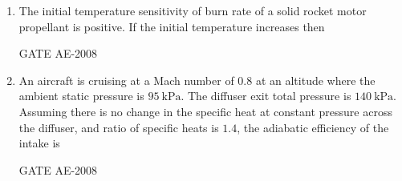 \documentclass[journal,12pt,onecolumn]{IEEEtran}
\theoremstyle{remark}
\begin{document}
\begin{enumerate}
\item The initial temperature sensitivity of burn rate of a solid rocket motor propellant is positive. If the initial temperature increases then  \\
\begin{enumerate}
\end{enumerate}
\hfill{GATE AE-2008}

    \quad

\item An aircraft is cruising at a Mach number of $0.8$ at an altitude where the ambient static pressure is $95 \ \mathrm{kPa}$. The diffuser exit total pressure is $140 \ \mathrm{kPa}$. Assuming there is no change in the specific heat at constant pressure across the diffuser, and ratio of specific heats is $1.4$, the adiabatic efficiency of the intake is  \\
\begin{enumerate}
\end{enumerate}
\hfill{GATE AE-2008}

    \quad


\end{enumerate}
\end{document}
